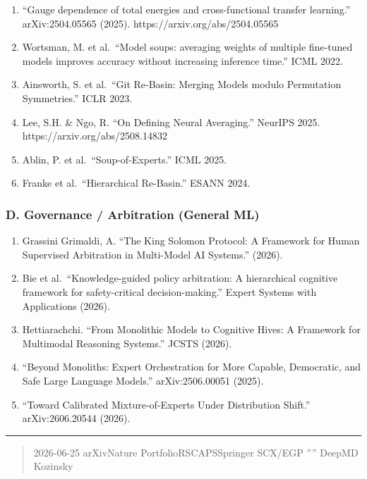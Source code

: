 \documentclass[
  12pt,
]{article}
\providecommand{\tightlist}{%
  \setlength{\itemsep}{0pt}\setlength{\parskip}{0pt}}
\begin{document}
\begin{enumerate}
\def\labelenumi{\arabic{enumi}.}
\setcounter{enumi}{14}
\tightlist
\item
  ``Gauge dependence of total energies and cross-functional transfer
  learning.'' arXiv:2504.05565 (2025). https://arxiv.org/abs/2504.05565
\item
  Wortsman, M. et al.~``Model soups: averaging weights of multiple
  fine-tuned models improves accuracy without increasing inference
  time.'' ICML 2022.
\item
  Ainsworth, S. et al.~``Git Re-Basin: Merging Models modulo Permutation
  Symmetries.'' ICLR 2023.
\item
  Lee, S.H. \& Ngo, R. ``On Defining Neural Averaging.'' NeurIPS 2025.
  https://arxiv.org/abs/2508.14832
\item
  Ablin, P. et al.~``Soup-of-Experts.'' ICML 2025.
\item
  Franke et al.~``Hierarchical Re-Basin.'' ESANN 2024.
\end{enumerate}

\subsubsection{D. Governance / Arbitration (General
ML)}\label{d.-governance-arbitration-general-ml}

\begin{enumerate}
\def\labelenumi{\arabic{enumi}.}
\setcounter{enumi}{20}
\tightlist
\item
  Grassini Grimaldi, A. ``The King Solomon Protocol: A Framework for
  Human Supervised Arbitration in Multi-Model AI Systems.'' (2026).
\item
  Bie et al.~``Knowledge-guided policy arbitration: A hierarchical
  cognitive framework for safety-critical decision-making.'' Expert
  Systems with Applications (2026).
\item
  Hettiarachchi. ``From Monolithic Models to Cognitive Hives: A
  Framework for Multimodal Reasoning Systems.'' JCSTS (2026).
\item
  ``Beyond Monoliths: Expert Orchestration for More Capable, Democratic,
  and Safe Large Language Models.'' arXiv:2506.00051 (2025).
\item
  ``Toward Calibrated Mixture-of-Experts Under Distribution Shift.''
  arXiv:2606.20544 (2026).
\end{enumerate}

\begin{center}\rule{0.5\linewidth}{0.5pt}\end{center}

\begin{quote}
 2026-06-25 arXivNature
PortfolioRSCAPSSpringer SCX/EGP
'''' DeepMD 
Kozinsky 
\end{quote}
\end{document}
